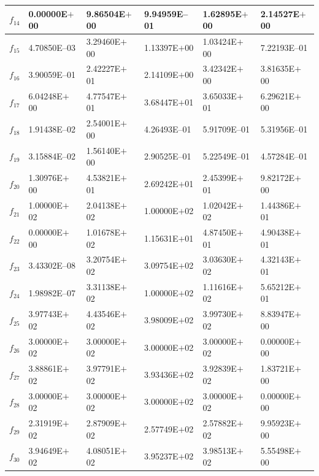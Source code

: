 \documentclass[graybox]{svmult}
\begin{document}
\begin{table}[!ht]
{\begin{tabular}{p{1cm}p{2.5cm}p{2.5cm}p{2.5cm}p{2.5cm}p{2.5cm}}
		$f_{14}$ & 0.00000E$+$00 & 9.86504E$+$00 & 9.94959E--01 & 1.62895E$+$00 & 2.14527E$+$00 \\ \hline
		$f_{15}$ & 4.70850E--03 & 3.29460E$+$00 & 1.13397E$+$00 & 1.03424E$+$00 & 7.22193E--01 \\ \hline
		$f_{16}$ & 3.90059E--01 & 2.42227E$+$01 & 2.14109E$+$00 & 3.42342E$+$00 & 3.81635E$+$00 \\ \hline
		$f_{17}$ & 6.04248E$+$00 & 4.77547E$+$01 & 3.68447E$+$01 & 3.65033E$+$01 & 6.29621E$+$00 \\ \hline
		$f_{18}$ & 1.91438E--02 & 2.54001E$+$00 & 4.26493E--01 & 5.91709E--01 & 5.31956E--01 \\ \hline
		$f_{19}$ & 3.15884E--02 & 1.56140E$+$00 & 2.90525E--01 & 5.22549E--01 & 4.57284E--01 \\ \hline
		$f_{20}$ & 1.30976E$+$00 & 4.53821E$+$01 & 2.69242E$+$01 & 2.45399E$+$01 & 9.82172E$+$00 \\ \hline
		$f_{21}$ & 1.00000E$+$02 & 2.04138E$+$02 & 1.00000E$+$02 & 1.02042E$+$02 & 1.44386E$+$01 \\ \hline
		$f_{22}$ & 0.00000E$+$00 & 1.01678E$+$02 & 1.15631E$+$01 & 4.87450E$+$01 & 4.90438E$+$01 \\ \hline
		$f_{23}$ & 3.43302E--08 & 3.20754E$+$02 & 3.09754E$+$02 & 3.03630E$+$02 & 4.32143E$+$01 \\ \hline
		$f_{24}$ & 1.98982E--07 & 3.31138E$+$02 & 1.00000E$+$02 & 1.11616E$+$02 & 5.65212E$+$01 \\ \hline
		$f_{25}$ & 3.97743E$+$02 & 4.43546E$+$02 & 3.98009E$+$02 & 3.99730E$+$02 & 8.83947E$+$00 \\ \hline
		$f_{26}$ & 3.00000E$+$02 & 3.00000E$+$02 & 3.00000E$+$02 & 3.00000E$+$02 & 0.00000E$+$00 \\ \hline
		$f_{27}$ & 3.88861E$+$02 & 3.97791E$+$02 & 3.93436E$+$02 & 3.92839E$+$02 & 1.83721E$+$00 \\ \hline
		$f_{28}$ & 3.00000E$+$02 & 3.00000E$+$02 & 3.00000E$+$02 & 3.00000E$+$02 & 0.00000E$+$00 \\ \hline
		$f_{29}$ & 2.31919E$+$02 & 2.87909E$+$02 & 2.57749E$+$02 & 2.57882E$+$02 & 9.95923E$+$00 \\ \hline
		$f_{30}$ & 3.94649E$+$02 & 4.08051E$+$02 & 3.95237E$+$02 & 3.98513E$+$02 & 5.55498E$+$00 \\ \hline
	\end{tabular}
}
\end{table}
\end{document}
